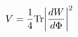 \begin{equation}
V = {1\over 4}{\rm Tr} \biggl | {{dW}\over {d\Phi}} \biggr |^2
\label{susysqrtV}
\end{equation}


